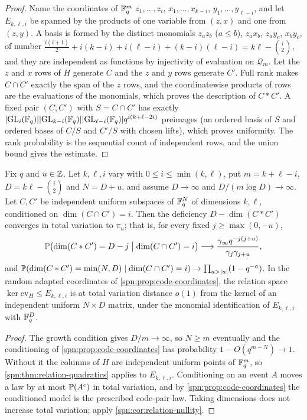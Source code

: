 \begin{proof}
Name the coordinates of $\mathbb{F}_q^m$ $z_1,\dots,z_i$, $x_1,\dots,x_{k-i}$, $y_1,\dots,y_{\ell-i}$, and let
$E_{k,\ell,i}$ be spanned by the products of one variable from $(z,x)$ and one from $(z,y)$. A basis
is formed by the distinct monomials $z_az_b$ ($a\le b$), $z_ax_b$, $z_ay_c$, $x_by_c$, of number
$\frac{i(i+1)}2+i(k-i)+i(\ell-i)+(k-i)(\ell-i)=k\ell-\binom i2$, and they are independent as functions
by injectivity of evaluation on $\mathcal Q_m$. Let the $z$ and $x$ rows of $H$ generate $C$ and the
$z$ and $y$ rows generate $C'$. Full rank makes $C\cap C'$ exactly the span of the $z$ rows, and the
coordinatewise products of rows are the evaluations of the monomials, which proves the description of
$C*C'$. A fixed pair $(C,C')$ with $S=C\cap C'$ has exactly
$\lvert\operatorname{GL}_i(\mathbb{F}_q)\rvert\lvert\operatorname{GL}_{k-i}(\mathbb{F}_q)\rvert\lvert\operatorname{GL}_{\ell-i}(\mathbb{F}_q)\rvert q^{i(k+\ell-2i)}$ preimages (an ordered
basis of $S$ and ordered bases of $C/S$ and $C'/S$ with chosen lifts), which proves uniformity. The rank
probability is the sequential count of independent rows, and the union bound gives the estimate.
\end{proof}

\begin{theorem}\label{spn:thm:code-products}
Fix $q$ and $u\in\mathbb{Z}$. Let $k,\ell,i$ vary with $0\le i\le\min(k,\ell)$, put $m=k+\ell-i$,
$D=k\ell-\binom i2$ and $N=D+u$, and assume $D\to\infty$ and $D/(m\log D)\to\infty$. Let $C,C'$ be
independent uniform subspaces of $\mathbb{F}_q^N$ of dimensions $k,\ell$, conditioned on $\dim(C\cap C')=i$.
Then the deficiency $D-\dim(C*C')$ converges in total variation to $\pi_u$; that is, for every fixed
$j\ge\max(0,-u)$,
\[
 \mathbb{P}\bigl(\dim(C*C')=D-j\bigm|\dim(C\cap C')=i\bigr)\longrightarrow
 \frac{\gamma_\infty q^{-j(j+u)}}{\gamma_j\gamma_{j+u}},
\]
and $\mathbb{P}(\dim(C*C')=\min(N,D)\mid\dim(C\cap C')=i)\to\prod_{a>\lvert u\rvert}(1-q^{-a})$. In the random
adapted coordinates of \cref{spn:prop:code-coordinates}, the relation space
$\ker\mathrm{ev}_H\le E_{k,\ell,i}$ is at total variation distance $o(1)$ from the kernel of an
independent uniform $N\times D$ matrix, under the monomial identification of $E_{k,\ell,i}$ with
$\mathbb{F}_q^D$.
\end{theorem}

\begin{proof}
The growth condition gives $D/m\to\infty$, so $N\ge m$ eventually and the conditioning of
\cref{spn:prop:code-coordinates} has probability $1-O(q^{m-N})\to1$. Without it the columns of $H$ are
independent uniform points of $\mathbb{F}_q^m$, so \cref{spn:thm:relation-quadratics} applies to
$E_{k,\ell,i}$. Conditioning on an event $A$ moves a law by at most $\mathbb{P}(A^c)$ in total variation, and
by \cref{spn:prop:code-coordinates} the conditioned model is the prescribed code-pair law. Taking
dimensions does not increase total variation; apply \cref{spn:cor:relation-nullity}.
\end{proof}

